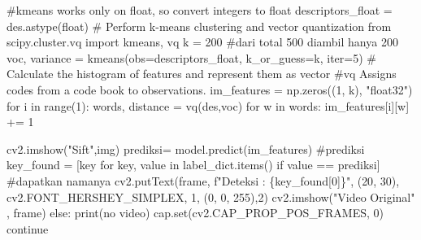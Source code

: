 \documentclass[
  letterpaper,
  DIV=11,
  numbers=noendperiod]{scrreprt}
\newenvironment{Shaded}{\begin{snugshade}}{\end{snugshade}}
\newcommand{\BuiltInTok}[1]{\textcolor[rgb]{0.00,0.23,0.31}{#1}}
\newcommand{\CommentTok}[1]{\textcolor[rgb]{0.37,0.37,0.37}{#1}}
\newcommand{\ControlFlowTok}[1]{\textcolor[rgb]{0.00,0.23,0.31}{#1}}
\newcommand{\DecValTok}[1]{\textcolor[rgb]{0.68,0.00,0.00}{#1}}
\newcommand{\ImportTok}[1]{\textcolor[rgb]{0.00,0.46,0.62}{#1}}
\newcommand{\KeywordTok}[1]{\textcolor[rgb]{0.00,0.23,0.31}{#1}}
\newcommand{\NormalTok}[1]{\textcolor[rgb]{0.00,0.23,0.31}{#1}}
\newcommand{\OperatorTok}[1]{\textcolor[rgb]{0.37,0.37,0.37}{#1}}
\newcommand{\SpecialCharTok}[1]{\textcolor[rgb]{0.37,0.37,0.37}{#1}}
\newcommand{\SpecialStringTok}[1]{\textcolor[rgb]{0.13,0.47,0.30}{#1}}
\newcommand{\StringTok}[1]{\textcolor[rgb]{0.13,0.47,0.30}{#1}}
\begin{document}
\begin{Shaded}
\begin{Highlighting}[]
                \CommentTok{\#kmeans works only on float, so convert integers to float}
\NormalTok{                descriptors\_float }\OperatorTok{=}\NormalTok{ des.astype(}\BuiltInTok{float}\NormalTok{)  }
                \CommentTok{\# Perform k{-}means clustering and vector quantization}
                \ImportTok{from}\NormalTok{ scipy.cluster.vq }\ImportTok{import}\NormalTok{ kmeans, vq}
\NormalTok{                k }\OperatorTok{=} \DecValTok{200}  \CommentTok{\#dari total 500 diambil hanya 200}
\NormalTok{                voc, variance }\OperatorTok{=}\NormalTok{ kmeans(obs}\OperatorTok{=}\NormalTok{descriptors\_float, k\_or\_guess}\OperatorTok{=}\NormalTok{k, }\BuiltInTok{iter}\OperatorTok{=}\DecValTok{5}\NormalTok{) }
                \CommentTok{\# Calculate the histogram of features and represent them as vector}
                \CommentTok{\#vq Assigns codes from a code book to observations.}
\NormalTok{                im\_features }\OperatorTok{=}\NormalTok{ np.zeros((}\DecValTok{1}\NormalTok{, k), }\StringTok{"float32"}\NormalTok{)}
                \ControlFlowTok{for}\NormalTok{ i }\KeywordTok{in} \BuiltInTok{range}\NormalTok{(}\DecValTok{1}\NormalTok{):}
\NormalTok{                    words, distance }\OperatorTok{=}\NormalTok{ vq(des,voc)}
                    \ControlFlowTok{for}\NormalTok{ w }\KeywordTok{in}\NormalTok{ words:}
\NormalTok{                        im\_features[i][w] }\OperatorTok{+=} \DecValTok{1}
                
\NormalTok{                cv2.imshow(}\StringTok{"Sift"}\NormalTok{,img)}
\NormalTok{                prediksi}\OperatorTok{=}\NormalTok{ model.predict(im\_features) }\CommentTok{\#prediksi}
\NormalTok{                key\_found }\OperatorTok{=}\NormalTok{ [key }\ControlFlowTok{for}\NormalTok{ key, value }\KeywordTok{in}\NormalTok{ label\_dict.items() }\ControlFlowTok{if}\NormalTok{ value }\OperatorTok{==}\NormalTok{ prediksi] }\CommentTok{\#dapatkan namanya}
\NormalTok{                cv2.putText(frame, }\SpecialStringTok{f"Deteksi : }\SpecialCharTok{\{}\NormalTok{key\_found[}\DecValTok{0}\NormalTok{]}\SpecialCharTok{\}}\SpecialStringTok{"}\NormalTok{, (}\DecValTok{20}\NormalTok{, }\DecValTok{30}\NormalTok{), cv2.FONT\_HERSHEY\_SIMPLEX, }\DecValTok{1}\NormalTok{, (}\DecValTok{0}\NormalTok{, }\DecValTok{0}\NormalTok{, }\DecValTok{255}\NormalTok{),}\DecValTok{2}\NormalTok{)}
\NormalTok{        cv2.imshow(}\StringTok{"Video Original"}\NormalTok{ , frame)}
    \ControlFlowTok{else}\NormalTok{:}
        \BuiltInTok{print}\NormalTok{(}\StringTok{\textquotesingle{}no video\textquotesingle{}}\NormalTok{)}
\NormalTok{        cap.}\BuiltInTok{set}\NormalTok{(cv2.CAP\_PROP\_POS\_FRAMES, }\DecValTok{0}\NormalTok{)}
        \ControlFlowTok{continue}


\end{Highlighting}
\end{Shaded}
\end{document}
